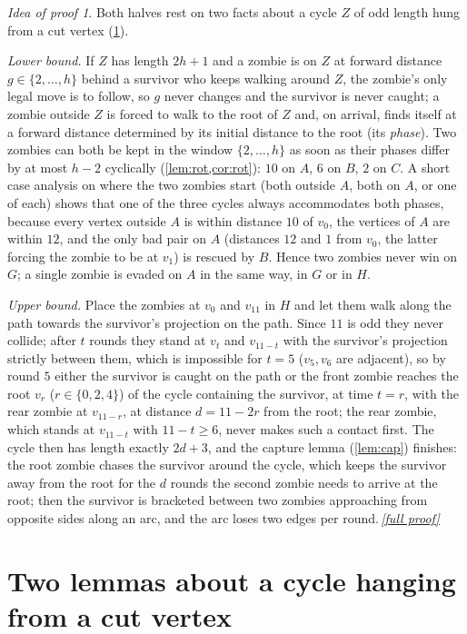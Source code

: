\documentclass[11pt,a4paper]{article}
\theoremstyle{plain}
\theoremstyle{definition}
\theoremstyle{remark}
\newtheorem*{proofidea}{Idea of proof}
\newcommand{\fullproofref}[1]{\,\hyperref[#1]{\textit{[full proof]}}}
\begin{document}
\begin{proofidea}
Both halves rest on two facts about a cycle $Z$ of odd length hung from a cut vertex (\cref{sec:lemmas}).

\emph{Lower bound.} If $Z$ has length $2h+1$ and a zombie is on $Z$ at forward distance $g\in\{2,\dots,h\}$ behind a survivor who keeps walking around $Z$, the zombie's only legal move is to follow, so $g$ never changes and the survivor is never caught; a zombie outside $Z$ is forced to walk to the root of $Z$ and, on arrival, finds itself at a forward distance determined by its initial distance to the root (its \emph{phase}). Two zombies can both be kept in the window $\{2,\dots,h\}$ as soon as their phases differ by at most $h-2$ cyclically (\cref{lem:rot,cor:rot}): $10$ on $A$, $6$ on $B$, $2$ on $C$. A short case analysis on where the two zombies start (both outside $A$, both on $A$, or one of each) shows that one of the three cycles always accommodates both phases, because every vertex outside $A$ is within distance $10$ of $v_0$, the vertices of $A$ are within $12$, and the only bad pair on $A$ (distances $12$ and $1$ from $v_0$, the latter forcing the zombie to be at $v_1$) is rescued by $B$. Hence two zombies never win on $G$; a single zombie is evaded on $A$ in the same way, in $G$ or in $H$.

\emph{Upper bound.} Place the zombies at $v_0$ and $v_{11}$ in $H$ and let them walk along the path towards the survivor's projection on the path. Since $11$ is odd they never collide; after $t$ rounds they stand at $v_t$ and $v_{11-t}$ with the survivor's projection strictly between them, which is impossible for $t=5$ ($v_5,v_6$ are adjacent), so by round $5$ either the survivor is caught on the path or the front zombie reaches the root $v_r$ ($r\in\{0,2,4\}$) of the cycle containing the survivor, at time $t=r$, with the rear zombie at $v_{11-r}$, at distance $d=11-2r$ from the root; the rear zombie, which stands at $v_{11-t}$ with $11-t\ge6$, never makes such a contact first. The cycle then has length exactly $2d+3$, and the capture lemma (\cref{lem:cap}) finishes: the root zombie chases the survivor around the cycle, which keeps the survivor away from the root for the $d$ rounds the second zombie needs to arrive at the root; then the survivor is bracketed between two zombies approaching from opposite sides along an arc, and the arc loses two edges per round.\fullproofref{pf:main}
\end{proofidea}

\section{Two lemmas about a cycle hanging from a cut vertex}\label{sec:lemmas}
\end{document}

